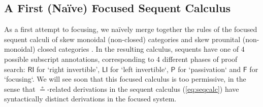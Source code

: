 \documentclass[submission,copyright,creativecommons]{eptcs}
\theoremstyle{definition}
\newcommand{\RI}{\mathsf{RI}}
\newcommand{\LI}{\mathsf{LI}}
\newcommand{\Pass}{\mathsf{P}}
\newcommand{\F}{\mathsf{F}}
\begin{document}
\subsection{A First (Na{\"i}ve) Focused Sequent Calculus}
As a first attempt to focusing, we na{\"i}vely merge together the rules of the focused sequent calculi of skew monoidal (non-closed) categories \cite{uustalu:sequent:2021} and skew prounital (non-monoidal) closed categories \cite{uustalu:deductive:nodate}. In the resulting calculus, sequents have one of 4 possible subscript annotations, corresponding to 4 different phases of proof search: $\RI$ for `right invertible', $\LI$ for `left invertible`, $\Pass$ for `passivation` and $\F$ for `focusing`. We will see soon that this focused calculus is too permissive, in the sense that $\circeq$-related derivations in the sequent calculus (\ref{eq:seqcalc}) have syntactically distinct derivations in the focused system.
\end{document}
